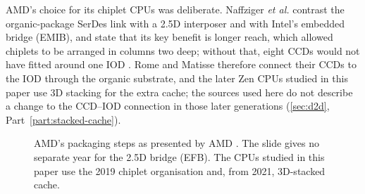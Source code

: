 AMD's choice for its chiplet CPUs was deliberate. Naffziger \emph{et al.} contrast the organic-package SerDes link with a 2.5D interposer and with Intel's embedded bridge (EMIB), and state that its key benefit is longer reach, which allowed chiplets to be arranged in columns two deep; without that, eight CCDs would not have fitted around one IOD \cite{naffziger2020chiplet}. Rome and Matisse therefore connect their CCDs to the IOD through the organic substrate, and the later Zen CPUs studied in this paper use 3D stacking for the extra cache; the sources used here do not describe a change to the CCD--IOD connection in those later generations (\cref{sec:d2d}, Part~\ref{part:stacked-cache}).

\begin{figure}[htbp]
\centering
{}
\caption[AMD's packaging steps as presented by AMD]{AMD's packaging steps as presented by AMD \cite[slide~5]{lambertHeterogenousIntegrationHigh2025}. The slide gives no separate year for the 2.5D bridge (EFB). The CPUs studied in this paper use the 2019 chiplet organisation and, from 2021, 3D-stacked cache.}
\label{fig:packaging-timeline}
\end{figure}

